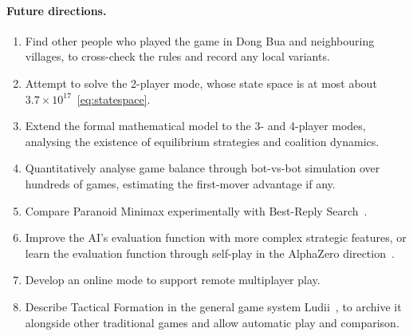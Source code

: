 \paragraph{Future directions.}
\begin{enumerate}[label=(\roman*)]
  \item Find other people who played the game in Dong Bua and neighbouring
        villages, to cross-check the rules and record any local variants.
  \item Attempt to solve the 2-player mode, whose state space is at most
        about $3.7\times10^{17}$~\eqref{eq:statespace}.
  \item Extend the formal mathematical model to the 3- and 4-player modes,
        analysing the existence of equilibrium strategies and coalition
        dynamics.
  \item Quantitatively analyse game balance through bot-vs-bot simulation
        over hundreds of games, estimating the first-mover advantage if any.
  \item Compare Paranoid Minimax experimentally with Best-Reply
        Search~\citep{schadd2011brs}.
  \item Improve the AI's evaluation function with more complex strategic
        features, or learn the evaluation function through self-play in the
        AlphaZero direction~\citep{silver2018alphazero}.
  \item Develop an online mode to support remote multiplayer play.
  \item Describe Tactical Formation in the general game system
        Ludii~\citep{piette2020ludii}, to archive it alongside other
        traditional games and allow automatic play and comparison.
\end{enumerate}
